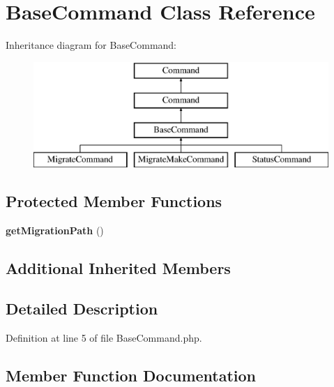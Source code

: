 \section{Base\+Command Class Reference}
\label{class_illuminate_1_1_database_1_1_console_1_1_migrations_1_1_base_command}
Inheritance diagram for Base\+Command\+:\begin{figure}[H]
\begin{center}
\leavevmode
\includegraphics[height=4.000000cm]{class_illuminate_1_1_database_1_1_console_1_1_migrations_1_1_base_command}
\end{center}
\end{figure}
\subsection*{Protected Member Functions}
\begin{DoxyCompactItemize}
\item 
{\bf get\+Migration\+Path} ()
\end{DoxyCompactItemize}
\subsection*{Additional Inherited Members}


\subsection{Detailed Description}


Definition at line 5 of file Base\+Command.\+php.



\subsection{Member Function Documentation}
